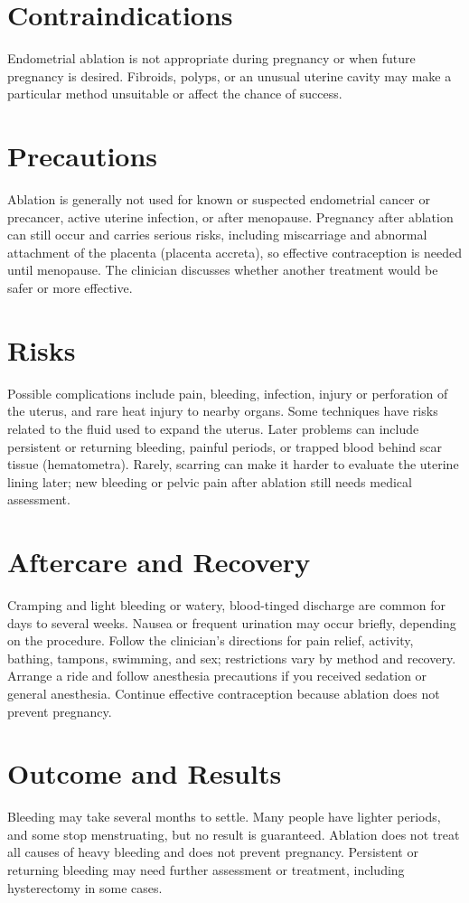 \section*{Contraindications}
Endometrial ablation is not appropriate during pregnancy or when future pregnancy is desired. Fibroids, polyps, or an unusual uterine cavity may make a particular method unsuitable or affect the chance of success.

\section*{Precautions}
Ablation is generally not used for known or suspected endometrial cancer or precancer, active uterine infection, or after menopause. Pregnancy after ablation can still occur and carries serious risks, including miscarriage and abnormal attachment of the placenta (placenta accreta), so effective contraception is needed until menopause. The clinician discusses whether another treatment would be safer or more effective.

\section*{Risks}
Possible complications include pain, bleeding, infection, injury or perforation of the uterus, and rare heat injury to nearby organs. Some techniques have risks related to the fluid used to expand the uterus. Later problems can include persistent or returning bleeding, painful periods, or trapped blood behind scar tissue (hematometra). Rarely, scarring can make it harder to evaluate the uterine lining later; new bleeding or pelvic pain after ablation still needs medical assessment.

\section*{Aftercare and Recovery}
Cramping and light bleeding or watery, blood-tinged discharge are common for days to several weeks. Nausea or frequent urination may occur briefly, depending on the procedure. Follow the clinician's directions for pain relief, activity, bathing, tampons, swimming, and sex; restrictions vary by method and recovery. Arrange a ride and follow anesthesia precautions if you received sedation or general anesthesia. Continue effective contraception because ablation does not prevent pregnancy.

\section*{Outcome and Results}
Bleeding may take several months to settle. Many people have lighter periods, and some stop menstruating, but no result is guaranteed. Ablation does not treat all causes of heavy bleeding and does not prevent pregnancy. Persistent or returning bleeding may need further assessment or treatment, including hysterectomy in some cases.

